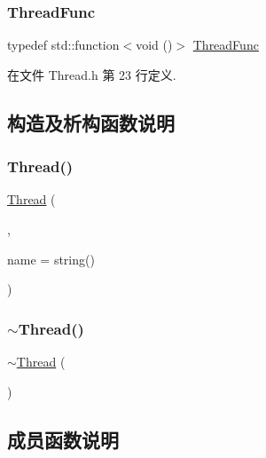 \subsubsection{\texorpdfstring{Thread\+Func}{ThreadFunc}}
{\footnotesize\ttfamily typedef std\+::function$<$void ()$>$ \hyperlink{classmuduo_1_1Thread_a72bd31ac00c06074792e7cff0c8e3022}{Thread\+Func}}



在文件 Thread.\+h 第 23 行定义.



\subsection{构造及析构函数说明}
\mbox{\label{classmuduo_1_1Thread_a2c3b1a6d86c989182ca7a9bb1aba48b3}} 
\subsubsection{\texorpdfstring{Thread()}{Thread()}}
{\footnotesize\ttfamily \hyperlink{classmuduo_1_1Thread}{Thread} (\begin{DoxyParamCaption}\item[{\hyperlink{classmuduo_1_1Thread_a72bd31ac00c06074792e7cff0c8e3022}{Thread\+Func}}]{,  }\item[{const string \&}]{name = {\ttfamily string()} }\end{DoxyParamCaption})\hspace{0.3cm}{\ttfamily [explicit]}}

\mbox{\label{classmuduo_1_1Thread_a87a9c69a69ee4b13cb1ec5772f6d32ad}} 
\subsubsection{\texorpdfstring{$\sim$\+Thread()}{~Thread()}}
{\footnotesize\ttfamily $\sim$\hyperlink{classmuduo_1_1Thread}{Thread} (\begin{DoxyParamCaption}{ }\end{DoxyParamCaption})}



\subsection{成员函数说明}
\mbox{\label{classmuduo_1_1Thread_ac942067a7e5a314610c1e89ff801f3bd}} 
